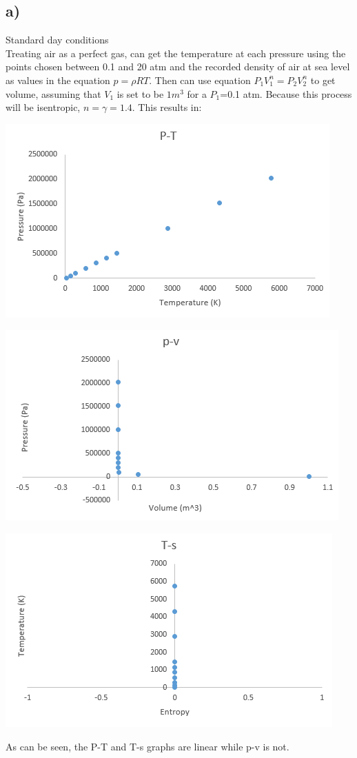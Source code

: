 \documentclass[preview,12pt]{article}
\begin{document}
    \subsection*{a)}
        Standard day conditions
        $$$$
        Treating air as a perfect gas, can get the temperature at each pressure using the points chosen between 0.1 and 20 atm and the recorded density of air at sea level as values in the equation $p=\rho RT$.  Then can use equation $P_1V_1^n=P_2V_2^n$ to get volume, assuming that $V_1$ is set to be $1m^3$ for a $P_1$=0.1 atm.  Because this process will be isentropic, $n=\gamma=1.4$.  This results in:
        
        \begin{center}
        \includegraphics[width=.5\textwidth]{HW2_PT1.PNG}
        \end{center}
        \begin{center}
        \includegraphics[width=.5\textwidth]{HW2_pv1.PNG}
        \end{center}
        \begin{center}
        \includegraphics[width=.5\textwidth]{HW2_ts1.PNG}
        \end{center}
    
        As can be seen, the P-T and T-s graphs are linear while p-v is not.
    
\end{document}
